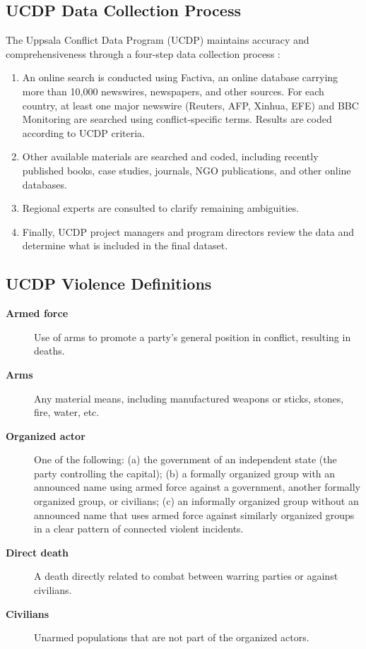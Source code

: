 \subsection{UCDP Data Collection Process}
\label{app:ucdp_process}

The Uppsala Conflict Data Program (UCDP) maintains accuracy and
comprehensiveness through a four-step data collection process
\citep{sundberg2010}:

\begin{enumerate}
    \item An online search is conducted using Factiva, an online database
    carrying more than 10,000 newswires, newspapers, and other sources.
    For each country, at least one major newswire (Reuters, AFP, Xinhua, EFE)
    and BBC Monitoring are searched using conflict-specific terms. Results
    are coded according to UCDP criteria.

    \item Other available materials are searched and coded, including
    recently published books, case studies, journals, NGO publications, and
    other online databases.

    \item Regional experts are consulted to clarify remaining ambiguities.

    \item Finally, UCDP project managers and program directors review the
    data and determine what is included in the final dataset.
\end{enumerate}

\subsection{UCDP Violence Definitions}
\label{app:violence_defs}

\begin{description}
    \item[\textbf{Armed force}] Use of arms to promote a party's general
    position in conflict, resulting in deaths.

    \item[\textbf{Arms}] Any material means, including manufactured weapons
    or sticks, stones, fire, water, etc.

    \item[\textbf{Organized actor}] One of the following: (a) the government
    of an independent state (the party controlling the capital); (b) a
    formally organized group with an announced name using armed force against
    a government, another formally organized group, or civilians; (c) an
    informally organized group without an announced name that uses armed force
    against similarly organized groups in a clear pattern of connected violent
    incidents.

    \item[\textbf{Direct death}] A death directly related to combat between
    warring parties or against civilians.

    \item[\textbf{Civilians}] Unarmed populations that are not part of the
    organized actors.
\end{description}

